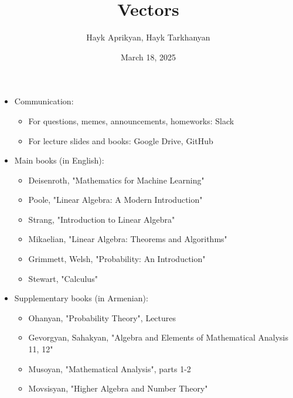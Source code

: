 \documentclass{beamer}
\title[Lecture 1]{Vectors}
\author[Aprikyan, Tarkhanyan]{Hayk Aprikyan, Hayk Tarkhanyan}
\institute[ACA]{Armenian Code Academy}
\date{March 18, 2025}
\begin{document}
\begin{frame}
  \titlepage
\end{frame}

\begin{frame}
\begin{itemize}
    \item Communication:
    \begin{itemize}
        \item For questions, memes, announcements, homeworks: Slack
        \item For lecture slides and books: Google Drive, GitHub
    \end{itemize}
    \medskip
    
    \item Main books (in English):

    \begin{itemize}
        \item Deisenroth, "Mathematics for Machine Learning"
        \item Poole, "Linear Algebra: A Modern Introduction"
        \item Strang, "Introduction to Linear Algebra"
        \item Mikaelian, "Linear Algebra: Theorems and Algorithms"
        \item Grimmett, Welsh, "Probability: An Introduction"
        \item Stewart, "Calculus"
\end{itemize}
    \item Supplementary books (in Armenian):
    
\begin{itemize}
        \item Ohanyan, "Probability Theory", Lectures
        \item Gevorgyan, Sahakyan, "Algebra and Elements of Mathematical Analysis 11, 12" 
        \item Musoyan, "Mathematical Analysis", parts 1-2 
        \item Movsisyan, "Higher Algebra and Number Theory" 
    \end{itemize}

    
\end{itemize}

\end{frame}
\end{document}
